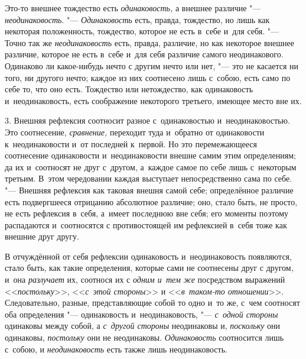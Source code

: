 Это-то внешнее тождество есть {\em одинаковость,} а
внешнее различие "--- {\em неодинаковость}. "---
{\em Одинаковость} есть, правда, тождество, но лишь как
некоторая положенность, тождество, которое не есть в~себе и~для себя. "---
Точно так же {\em неодинаковость} есть, правда,
различие, но как некоторое внешнее различие, которое не есть в~себе и~для
себя различие самого неодинакового. Одинаково ли какое-нибудь нечто с
другим нечто или нет, "--- это не касается ни того, ни другого нечто; каждое
из них соотнесено лишь с~собою, есть само по себе то, что оно есть.
Тождество или нетождество, как одинаковость и~неодинаковость, есть
соображение некоторого третьего, имеющее место вне их.

3. Внешняя рефлексия соотносит разное с~одинаковостью и~неодинаковостью. Это
соотнесение, {\em сравнение,} переходит туда и~обратно
от одинаковости к~неодинаковости и~от последней к~первой. Но это
перемежающееся соотнесение одинаковости и~неодинаковости внешне самим этим
определениям; да их и~соотносят не друг с~другом, а~каждое самое по себе
лишь с~некоторым третьим. В~этом чередовании каждая выступает
непосредственно сама по себе. "--- Внешняя рефлексия как таковая внешня самой
себе; определённое различие есть подвергшееся отрицанию абсолютное
различие; оно, стало быть, не просто, не есть рефлексия в~себя, а~имеет
последнюю вне себя; его моменты поэтому распадаются и~соотносятся с
противостоящей им рефлексией в~себя тоже как внешние друг другу.

В отчуждённой от себя рефлексии одинаковость и~неодинаковость появляются,
стало быть, как такие определения, которые сами не соотнесены друг с
другом, и~она {\em разлучает} их, соотнося их с
{\em одним и~тем же} посредством выражений <<{\em постольку}>>,
<<{\em с~этой стороны}>> и <<{\em в~таком-то отношении}>>.
Следовательно, разные, представляющие собой то одно и~то же, с~чем
соотносят оба определения "--- одинаковость и~неодинаковость, "---
{\em с~одной стороны} одинаковы между собой, а
{\em с~другой стороны} неодинаковы и,
{\em поскольку} они одинаковы, {\em постольку} они не неодинаковы.
{\em Одинаковость} соотносится лишь с~собою, и
{\em неодинаковость} есть также лишь неодинаковость.


